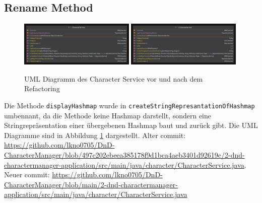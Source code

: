 \subsection{Rename Method}
\begin{figure}[H]
	\centering
	\includegraphics[width=0.49\textwidth]{Bilder/CharacterService-old.pdf}
	\includegraphics[width=0.49\textwidth]{Bilder/CharacterService.pdf}
	\caption{UML Diagramm des Character Service vor und nach dem Refactoring}
	\label{fig:rename}
\end{figure}
Die Methode \texttt{displayHashmap} wurde in \texttt{createStringRepresantationOfHashmap} umbennant, da die Methode keine Hashmap darstellt, sondern eine Stringrepräsentation einer übergebenen Hashmap baut und zurück gibt. Die UML Diagramme sind in Abbildung \ref{fig:rename} dargestellt. Alter commit: \href{https://github.com/lkno0705/DnD-CharacterManager/blob/497c202ebeea385178f9d1bca4aeb3401d92619c/2-dnd-charactermanager-application/src/main/java/character/CharacterService.java}{https://github.com/lkno0705/DnD-CharacterManager/blob/497c202ebeea385178f9d1bca4aeb3401d92619c/2-dnd-charactermanager-application/src/main/java/character/CharacterService.java}. Neuer commit: \href{https://github.com/lkno0705/DnD-CharacterManager/blob/main/2-dnd-charactermanager-application/src/main/java/character/CharacterService.java}{https://github.com/lkno0705/DnD-CharacterManager/blob/main/2-dnd-charactermanager-application/src/main/java/character/CharacterService.java}

